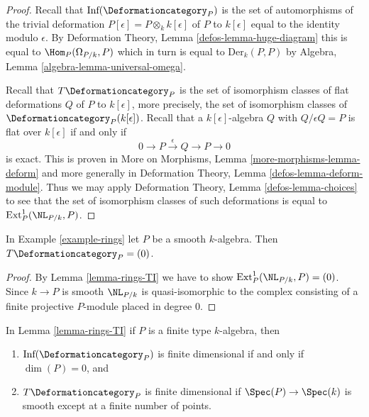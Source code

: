 \begin{proof}
Recall that $\text{Inf}(\Deformationcategory_P)$ is the set of
automorphisms of the trivial deformation
$P[\epsilon] = P \otimes_k k[\epsilon]$ of $P$ to $k[\epsilon]$
equal to the identity modulo $\epsilon$.
By Deformation Theory, Lemma \ref{defos-lemma-huge-diagram}
this is equal to $\Hom_P(\Omega_{P/k}, P)$ which in turn is
equal to $\text{Der}_k(P, P)$ by
Algebra, Lemma \ref{algebra-lemma-universal-omega}.

\medskip\noindent
Recall that $T\Deformationcategory_P$ is the set of isomorphism classes
of flat deformations $Q$ of $P$ to $k[\epsilon]$, more precisely,
the set of isomorphism classes of $\Deformationcategory_P(k[\epsilon])$.
Recall that a $k[\epsilon]$-algebra $Q$ with $Q/\epsilon Q = P$
is flat over $k[\epsilon]$ if and only if
$$
0 \to P \xrightarrow{\epsilon} Q \to P \to 0
$$
is exact. This is proven in More on Morphisms, Lemma
\ref{more-morphisms-lemma-deform} and more generally in
Deformation Theory, Lemma \ref{defos-lemma-deform-module}.
Thus we may apply
Deformation Theory, Lemma \ref{defos-lemma-choices}
to see that the set of isomorphism classes of such
deformations is equal to $\text{Ext}^1_P(\NL_{P/k}, P)$.
\end{proof}

\begin{lemma}
\label{lemma-smooth}
In Example \ref{example-rings} let $P$ be a smooth $k$-algebra. Then
$T\Deformationcategory_P = (0)$.
\end{lemma}

\begin{proof}
By Lemma \ref{lemma-rings-TI} we have to show
$\text{Ext}^1_P(\NL_{P/k}, P) = (0)$.
Since $k \to P$ is smooth $\NL_{P/k}$ is quasi-isomorphic to the
complex consisting of a finite projective
$P$-module placed in degree $0$.
\end{proof}

\begin{lemma}
\label{lemma-finite-type-rings-TI}
In Lemma \ref{lemma-rings-TI} if $P$ is a finite type $k$-algebra, then
\begin{enumerate}
\item $\text{Inf}(\Deformationcategory_P)$ is finite dimensional if and only if
$\dim(P) = 0$, and
\item $T\Deformationcategory_P$ is finite dimensional if
$\Spec(P) \to \Spec(k)$ is smooth except at a finite number of points.
\end{enumerate}
\end{lemma}

